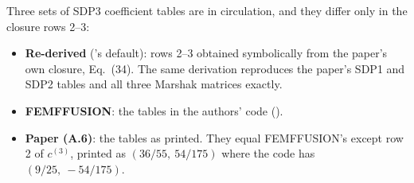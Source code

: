 Three sets of SDP3 coefficient tables are in circulation, and they differ only
in the closure rows 2--3:

\begin{itemize}
\item \textbf{Re-derived} (\garnet's default): rows 2--3 obtained symbolically
  from the paper's own closure, Eq.~(34). The same derivation reproduces the
  paper's SDP1 and SDP2 tables and all three Marshak matrices exactly.
\item \textbf{FEMFFUSION}: the tables in the authors' code
  ().
\item \textbf{Paper (A.6)}: the tables as printed. They equal FEMFFUSION's
  except row 2 of $c^{(3)}$, printed as $(36/55,\ 54/175)$ where the code has
  $(9/25,\ -54/175)$.
\end{itemize}

\begin{table}[h]
\caption{Brantley--Larsen SDP3 with Marshak vacuum and the three coefficient
sets. $k_\infty$ is extrapolated from $n = 80, 160, 320$.}
\label{tab:bl-a6}
\end{table}


